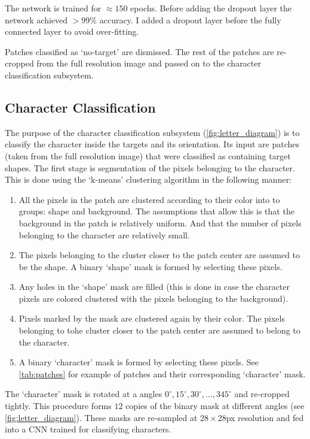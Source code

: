 \documentclass{article} %
\begin{document}
The network is trained for $\approx150$ epochs. Before adding the dropout layer the
network achieved $>99\%$ accuracy. I added a dropout layer before the fully connected layer to
avoid over-fitting.

Patches classified as `no-target' are dismissed. The rest of the patches are re-cropped from
the full resolution image and passed on to the character classification subsystem.

\subsection{Character Classification}
\label{sec:char_class}

The purpose of the character classification subsystem (\cref{fig:letter_diagram})  is to classify
the character inside the targets and its orientation. Its input are patches (taken from
the full resolution image) that were classified as containing target shapes. The first stage is
segmentation of the pixels belonging to the character. This is done using the `k-means' clustering
algorithm in the following manner:
\begin{enumerate}
	\item All the pixels in the patch are clustered according to their color into to groups: shape
	and background. The assumptions that allow this is that the background in the patch is relatively
	uniform. And that the number of pixels belonging to the character are relatively small.
	\item The pixels belonging to the cluster closer to the patch center are assumed to be the
	shape. A binary `shape' mask is formed by selecting these pixels.
	\item Any holes in the `shape' mask are filled (this is done in case the character pixels are
	colored clustered with the pixels belonging to the background).
	\item Pixels marked by the mask are clustered again by their color. The pixels belonging to tohe
	cluster closer to the patch center are assumed to belong to the character.
	\item A binary `character' mask is formed by selecting these pixels. See \cref{tab:patches} for 
	example of patches and their corresponding `character' mask.
\end{enumerate}

The `character' mask is rotated at a angles $0^\circ,15^\circ,30^\circ,\dots,345^\circ$ and re-cropped
tightly. This procedure forms $12$ copies of the binary mask at different angles (see \cref{fig:letter_diagram}).
These masks are re-sampled at $28\times28$px resolution and fed into a CNN trained for classifying
characters.
\end{document}
